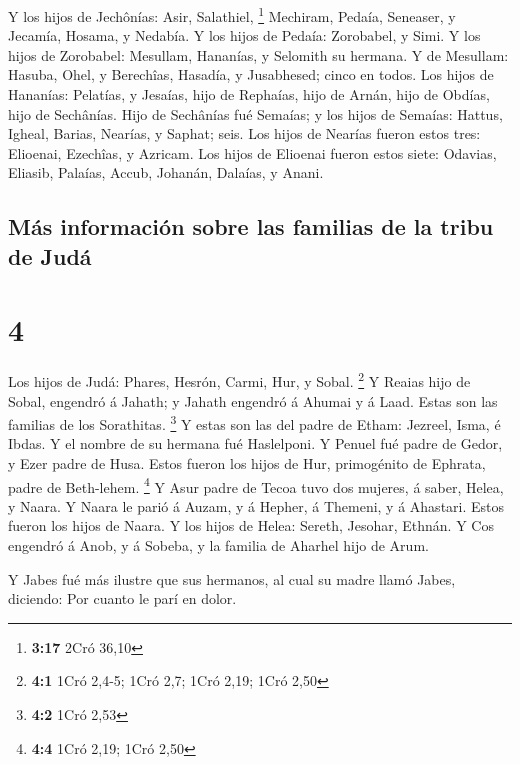  Y los hijos de Jechônías: Asir, Salathiel, \footnote{\textbf{3:17}
  2Cró 36,10}  Mechiram, Pedaía, Seneaser, y Jecamía,
Hosama, y Nedabía.  Y los hijos de Pedaía: Zorobabel, y
Simi. Y los hijos de Zorobabel: Mesullam, Hananías, y Selomith su
hermana.  Y de Mesullam: Hasuba, Ohel, y Berechîas,
Hasadía, y Jusabhesed; cinco en todos.  Los hijos de
Hananías: Pelatías, y Jesaías, hijo de Rephaías, hijo de Arnán, hijo de
Obdías, hijo de Sechânías.  Hijo de Sechânías fué
Semaías; y los hijos de Semaías: Hattus, Igheal, Barias, Nearías, y
Saphat; seis.  Los hijos de Nearías fueron estos tres:
Elioenai, Ezechîas, y Azricam.  Los hijos de Elioenai
fueron estos siete: Odavias, Eliasib, Palaías, Accub, Johanán, Dalaías,
y Anani.

\hypertarget{muxe1s-informaciuxf3n-sobre-las-familias-de-la-tribu-de-juduxe1}{%
\subsection{Más información sobre las familias de la tribu de
Judá}\label{muxe1s-informaciuxf3n-sobre-las-familias-de-la-tribu-de-juduxe1}}

\hypertarget{section-3}{%
\section{4}\label{section-3}}

 Los hijos de Judá: Phares, Hesrón, Carmi, Hur, y Sobal.
\footnote{\textbf{4:1} 1Cró 2,4-5; 1Cró 2,7; 1Cró 2,19; 1Cró 2,50}
 Y Reaias hijo de Sobal, engendró á Jahath; y Jahath
engendró á Ahumai y á Laad. Estas son las familias de los Sorathitas.
\footnote{\textbf{4:2} 1Cró 2,53}  Y estas son las del
padre de Etham: Jezreel, Isma, é Ibdas. Y el nombre de su hermana fué
Haslelponi.  Y Penuel fué padre de Gedor, y Ezer padre de
Husa. Estos fueron los hijos de Hur, primogénito de Ephrata, padre de
Beth-lehem. \footnote{\textbf{4:4} 1Cró 2,19; 1Cró 2,50} 
Y Asur padre de Tecoa tuvo dos mujeres, á saber, Helea, y Naara.
 Y Naara le parió á Auzam, y á Hepher, á Themeni, y á
Ahastari. Estos fueron los hijos de Naara.  Y los hijos de
Helea: Sereth, Jesohar, Ethnán.  Y Cos engendró á Anob, y
á Sobeba, y la familia de Aharhel hijo de Arum.

 Y Jabes fué más ilustre que sus hermanos, al cual su
madre llamó Jabes, diciendo: Por cuanto le parí en dolor.

